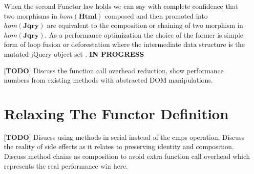 \documentclass[preprint]{sigplanconf}
\begin{document}
 When the second Functor law holds we can say with complete confidence that two morphisms in \begin{math}hom(\mathbf{Html})\end{math} composed and then promoted into \begin{math}hom(\mathbf{Jqry})\end{math} are equivalent to the composition or chaining of two morphism in \begin{math}hom(\mathbf{Jqry})\end{math}. As a performance optimization the choice of the former is simple form of loop fusion or deforestation where the intermediate data structure is the mutated jQuery object set \cite{bib:deforestation}.
\textbf{IN PROGRESS}


[\textbf{TODO}] Discuss the function call overhead reduction, show performance numbers from existing methods with abstracted DOM manipulations.


\section{Relaxing The Functor Definition}

[\textbf{TODO}] Disucss using methods in serial instead of the cmps operation. Discuss the reality of side effects as it relates to preserving identity and composition. Discuss method chains as composition to avoid extra function call overhead which represents the real performance win here.
\end{document}
